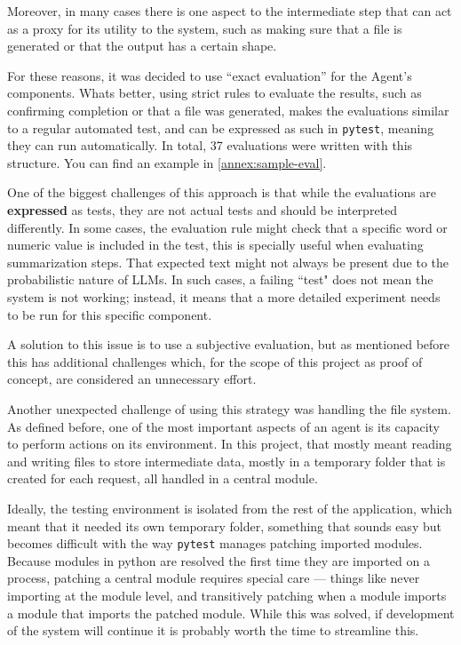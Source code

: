 \documentclass[a4paper]{report}
\begin{document}
Moreover, in many cases there is one aspect to the intermediate step that can act as a proxy for its utility to the system, such as making sure that a file is generated or that the output has a certain shape.

For these reasons, it was decided to use ``exact evaluation'' for the Agent's components. Whats better, using strict rules to evaluate the results, such as confirming completion or that a file was generated, makes the evaluations similar to a regular automated test, and can be expressed as such in \texttt{pytest}, meaning they can run automatically. In total, 37 evaluations were written with this structure. You can find an example in \autoref{annex:sample-eval}.

One of the biggest challenges of this approach is that while the evaluations are \textbf{expressed} as tests, they are not actual tests and should be interpreted differently. In some cases, the evaluation rule might check that a specific word or numeric value is included in the test, this is specially useful when evaluating summarization steps. That expected text might not always be present due to the probabilistic nature of LLMs. In such cases, a failing ``test" does not mean the system is not working; instead, it means that a more detailed experiment needs to be run for this specific component.

A solution to this issue is to use a subjective evaluation, but as mentioned before this has additional challenges which, for the scope of this project as proof of concept, are considered an unnecessary effort.

Another unexpected challenge of using this strategy was handling the file system. As defined before, one of the most important aspects of an agent is its capacity to perform actions on its environment. In this project, that mostly meant reading and writing files to store intermediate data, mostly in a temporary folder that is created for each request, all handled in a central module.

Ideally, the testing environment is isolated from the rest of the application, which meant that it needed its own temporary folder, something that sounds easy but becomes difficult with the way \texttt{pytest} manages patching imported modules. Because modules in python are resolved the first time they are imported on a process, patching a central module requires special care --- things like never importing at the module level, and transitively patching when a module imports a module that imports the patched module. While this was solved, if development of the system will continue it is probably worth the time to streamline this.
\end{document}
